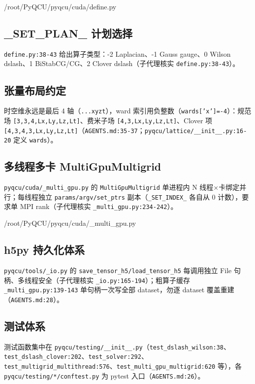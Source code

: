 \documentclass[UTF8]{ctexart}
\begin{document}
\begin{lstinputlisting}[firstline=36,lastline=43,language=python]{/root/PyQCU/pyqcu/cuda/define.py}
\end{lstinputlisting}

\subsection{\_SET\_PLAN\_ 计划选择}
\texttt{define.py:38-43} 给出算子类型：-2 Laplacian、-1 Gauss gauge、0 Wilson dslash、1 BiStabCG/CG、2 Clover dslash（子代理核实 \texttt{define.py:38-43}）。

\subsection{张量布局约定}
时空维永远是最后 4 轴（\texttt{...xyzt}），ward 索引用负整数（\texttt{wards['x']=-4}）：规范场 \texttt{[3,3,4,Lx,Ly,Lz,Lt]}、费米子场 \texttt{[4,3,Lx,Ly,Lz,Lt]}、Clover 项 \texttt{[4,3,4,3,Lx,Ly,Lz,Lt]}（\texttt{AGENTS.md:35-37}；\texttt{pyqcu/lattice/\_\_init\_\_.py:16-20} 定义 \texttt{wards}）。

\subsection{多线程多卡 MultiGpuMultigrid}
\texttt{pyqcu/cuda/\_multi\_gpu.py} 的 \texttt{MultiGpuMultigrid} 单进程内 N 线程×卡绑定并行；每线程独立 \texttt{params/argv/set\_ptrs} 副本（\texttt{\_SET\_INDEX\_} 各自从 0 计数），要求单 MPI rank（子代理核实 \texttt{\_multi\_gpu.py:234-242}）。

\begin{lstinputlisting}[firstline=234,lastline=242,language=python]{/root/PyQCU/pyqcu/cuda/_multi_gpu.py}
\end{lstinputlisting}

\subsection{h5py 持久化体系}
\texttt{pyqcu/tools/\_io.py} 的 \texttt{save\_tensor\_h5/load\_tensor\_h5} 每调用独立 File 句柄、多线程安全（子代理核实 \texttt{\_io.py:165-194}）；粗算子缓存 \texttt{\_multi\_gpu.py:139-143} 单句柄一次写全部 dataset，勿逐 dataset 覆盖重建（\texttt{AGENTS.md:28}）。

\subsection{测试体系}
测试函数集中在 \nolinkurl{pyqcu/testing/__init__.py}（\nolinkurl{test_dslash_wilson:38}、\nolinkurl{test_dslash_clover:202}、\nolinkurl{test_solver:292}、\nolinkurl{test_multigrid_multithread:576}、\nolinkurl{test_multi_gpu_multigrid:620} 等），各 \nolinkurl{pyqcu/testing/*/conftest.py} 为 pytest 入口（\texttt{AGENTS.md:26}）。
\end{document}
